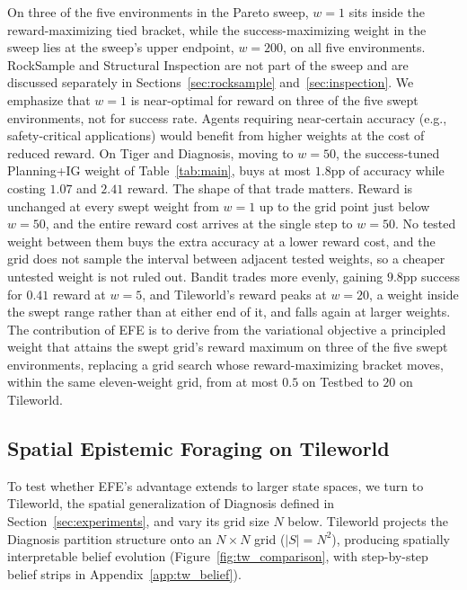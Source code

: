 On three of the five environments in the Pareto sweep, $w{=}1$ sits inside the reward-maximizing tied bracket, while the success-maximizing weight in the sweep lies at the sweep's upper endpoint, $w{=}200$, on all five environments. RockSample and Structural Inspection are not part of the sweep and are discussed separately in Sections~\ref{sec:rocksample} and~\ref{sec:inspection}. We emphasize that $w{=}1$ is near-optimal for reward on three of the five swept environments, not for success rate. Agents requiring near-certain accuracy (e.g., safety-critical applications) would benefit from higher weights at the cost of reduced reward. On Tiger and Diagnosis, moving to $w{=}50$, the success-tuned Planning+IG weight of Table~\ref{tab:main}, buys at most $1.8$pp of accuracy while costing $1.07$ and $2.41$ reward. The shape of that trade matters. Reward is unchanged at every swept weight from $w{=}1$ up to the grid point just below $w{=}50$, and the entire reward cost arrives at the single step to $w{=}50$. No tested weight between them buys the extra accuracy at a lower reward cost, and the grid does not sample the interval between adjacent tested weights, so a cheaper untested weight is not ruled out. Bandit trades more evenly, gaining $9.8$pp success for $0.41$ reward at $w{=}5$, and Tileworld's reward peaks at $w{=}20$, a weight inside the swept range rather than at either end of it, and falls again at larger weights. The contribution of EFE is to derive from the variational objective a principled weight that attains the swept grid's reward maximum on three of the five swept environments, replacing a grid search whose reward-maximizing bracket moves, within the same eleven-weight grid, from at most $0.5$ on Testbed to $20$ on Tileworld.

\subsection{Spatial Epistemic Foraging on Tileworld}
\label{sec:tileworld}

To test whether EFE's advantage extends to larger state spaces, we turn to Tileworld, the spatial generalization of Diagnosis defined in Section~\ref{sec:experiments}, and vary its grid size $N$ below. Tileworld projects the Diagnosis partition structure onto an $N{\times}N$ grid ($|S|{=}N^2$), producing spatially interpretable belief evolution (Figure~\ref{fig:tw_comparison}, with step-by-step belief strips in Appendix~\ref{app:tw_belief}).

